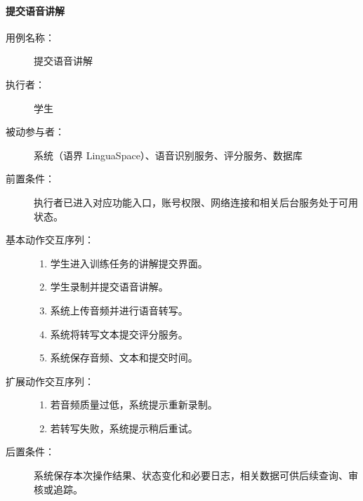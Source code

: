 \paragraph{提交语音讲解}
\begin{description}
  \item[用例名称：] 提交语音讲解
  \item[执行者：] 学生
  \item[被动参与者：] 系统（语界 LinguaSpace）、语音识别服务、评分服务、数据库
  \item[前置条件：] 执行者已进入对应功能入口，账号权限、网络连接和相关后台服务处于可用状态。
  \item[基本动作交互序列：]
  \begin{enumerate}
    \item 学生进入训练任务的讲解提交界面。
    \item 学生录制并提交语音讲解。
    \item 系统上传音频并进行语音转写。
    \item 系统将转写文本提交评分服务。
    \item 系统保存音频、文本和提交时间。
  \end{enumerate}
  \item[扩展动作交互序列：]
  \begin{enumerate}
    \item[3a.] 若音频质量过低，系统提示重新录制。
    \item[4a.] 若转写失败，系统提示稍后重试。
  \end{enumerate}
  \item[后置条件：] 系统保存本次操作结果、状态变化和必要日志，相关数据可供后续查询、审核或追踪。
\end{description}

